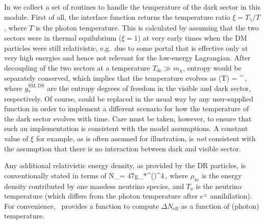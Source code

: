 \label{ch:vdSIDM_rd}

In  we collect a set of routines to handle the temperature of the dark sector
in this module. First of all, the interface function  returns the temperature ratio $\xi=T_{\tilde\gamma}/T$,
where $T$ is the photon temperature. This is calculated by assuming that the two sectors were  in thermal
equilubrium ($\xi=1$) at very early times when the DM particles were still relativistic, e.g.~due to some portal
that is effective only at very high energies and hence not relevant for the low-energy Lagrangian. 
After decoupling of the two sectors at a temperature $T_\mathrm{dc}\gg m_\chi$, 
entropy would be separately conserved, which implies that the temperature evolves as 
\be
 \xi(T) = 
 {^}\,,
 \ee
where $g_*^{\mathrm{SM}, \mathrm{DS}}$ are the entropy degrees of freedom in the visible
and dark sector, respectively. Of course,   could be replaced in the usual way by any user-supplied function 
in order to implement a different scenario for how the temperature of the dark sector evolves with time.
Care must be taken, however, to ensure that such an implementation is consistent with the model assumptions.
A constant value of $\xi$ for example, as is often assumed for illustration, is {\it not} consistent with the assumption
that there is no interaction between dark and visible sector.

Any additional relativistic energy density, as provided by the DR particles, is conventionally stated in terms of
\be
 \Delta N_\equiv {}=  
 \frac47g_*^\left(\right)^4\,,
\ee
where $\rho_\mathrm{1\nu}$ is the energy density contributed by one massless neutrino species, and $T_\nu$ is the neutrino
temperature (which differs from the photon temperature after $e^\pm$ annihilation). For convenience, \ds\ provides a 
function  to compute $\Delta N_\mathrm{eff}$ as a function of (photon) temperature.
